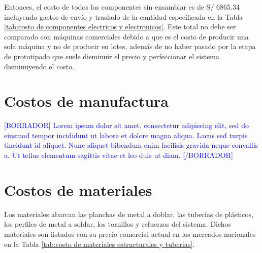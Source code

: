 Entonces, el costo de todos los componentes sin ensamblar es de S/ 6865.34 incluyendo gastos de envío y traslado de la cantidad específicada en la Tabla \ref{tab:costo de componentes electricos y electronicos}. Este total no debe ser comparado con máquinas comerciales debido a que es el costo de producir una sola máquina y no de producir en lotes, además de no haber pasado por la etapa de prototipado que suele disminuir el precio y perfeccionar el sistema disminuyendo el costo.


\section{Costos de manufactura}

\textcolor{blue}{[BORRADOR] Lorem ipsum dolor sit amet, consectetur adipiscing elit, sed do eiusmod tempor incididunt ut labore et dolore magna aliqua. Lacus sed turpis tincidunt id aliquet. Nunc aliquet bibendum enim facilisis gravida neque convallis a. Ut tellus elementum sagittis vitae et leo duis ut diam. [/BORRADOR]} 

\section{Costos de materiales}

Los materiales abarcan las planchas de metal a doblar, las tuberías de plásticos, los perfiles de metal a soldar, los tornillos y refuerzos del sistema. Dichos materiales son listados con su precio comercial actual en los mercados nacionales en la Tabla \ref{tab:costo de materiales estructurales y tuberias}.

